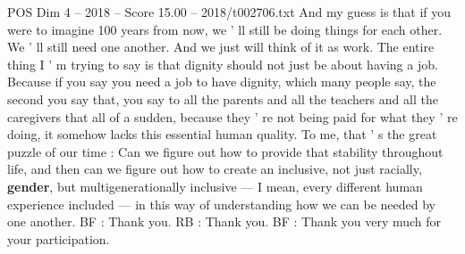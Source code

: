 \begin{textsample}{POS Dim 4 – 2018 – Score 15.00 – 2018/t002706.txt}
And my guess is that if you were to imagine 100 years from now, we ' ll still be doing things for each other.
We ' ll still need one another.
And we just will think of it as work.
The entire thing I ' m trying to say is that dignity should not just be about having a job.
Because if you say you need a job to have dignity, which many people say, the second you say that, you say to all the parents and all the teachers and all the caregivers that all of a sudden, because they ' re not being paid for what they ' re doing, it somehow lacks this essential human quality.
To me, that ' s the great puzzle of our time : Can we figure out how to provide that stability throughout life, and then can we figure out how to create an inclusive, not just racially, \textbf{gender}, but multigenerationally inclusive — I mean, every different human experience included — in this way of understanding how we can be needed by one another.
BF : Thank you.
RB : Thank you.
BF : Thank you very much for your participation.

\end{textsample}
